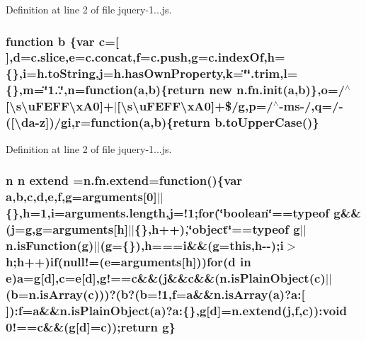Definition at line 2 of file jquery-\/1...\+js.

\hypertarget{jquery-1_811_80_8js_ac0431efac4d7c393d1e70b86115cb93f}{
\subsubsection[{b}]{\setlength{\rightskip}{0pt plus 5cm}function b \{var {\bf c}=\mbox{[}$\,$\mbox{]},{\bf d}=c.\+slice,{\bf e}=c.\+concat,f=c.\+push,g=c.\+index\+Of,h=\{\},i=h.\+to\+String,j=h.\+has\+Own\+Property,k=\char`\"{}\char`\"{}.trim,l=\{\},m=\char`\"{}1..\char`\"{},n=function({\bf a},b)\{return new n.\+fn.\+init({\bf a},b)\},o=/$^\wedge$\mbox{[}\textbackslash{}s\textbackslash{}u\+F\+E\+F\+F\textbackslash{}x\+A0\mbox{]}+$\vert$\mbox{[}\textbackslash{}s\textbackslash{}u\+F\+E\+F\+F\textbackslash{}x\+A0\mbox{]}+\$/g,p=/$^\wedge$-\/ms-\//,q=/-\/(\mbox{[}\textbackslash{}da-\/z\mbox{]})/gi,r=function({\bf a},b)\{return b.\+to\+Upper\+Case()\}}}\label{jquery-1_811_80_8js_ac0431efac4d7c393d1e70b86115cb93f}


Definition at line 2 of file jquery-\/1...\+js.

\hypertarget{jquery-1_811_80_8js_a95a6433c7ca35778b94dc2489f6838c9}{
\subsubsection[{extend}]{\setlength{\rightskip}{0pt plus 5cm}n n extend =n.\+fn.\+extend=function()\{var {\bf a},{\bf b},{\bf c},{\bf d},{\bf e},f,g=arguments\mbox{[}0\mbox{]}$\vert$$\vert$\{\},h=1,i=arguments.\+length,j=!1;for(\char`\"{}boolean\char`\"{}==typeof g\&\&(j=g,g=arguments\mbox{[}h\mbox{]}$\vert$$\vert$\{\},h++),\char`\"{}object\char`\"{}==typeof g$\vert$$\vert$n.\+is\+Function(g)$\vert$$\vert$(g=\{\}),h===i\&\&(g=this,h-\/-\/);i$>$h;h++){\bf if}(null!=({\bf e}=arguments\mbox{[}h\mbox{]}))for({\bf d} in {\bf e}){\bf a}=g\mbox{[}{\bf d}\mbox{]},{\bf c}={\bf e}\mbox{[}{\bf d}\mbox{]},g!=={\bf c}\&\&(j\&\&{\bf c}\&\&(n.\+is\+Plain\+Object({\bf c})$\vert$$\vert$({\bf b}=n.\+is\+Array({\bf c})))?({\bf b}?({\bf b}=!1,f={\bf a}\&\&n.\+is\+Array({\bf a})?a\+:\mbox{[}$\,$\mbox{]})\+:f={\bf a}\&\&n.\+is\+Plain\+Object({\bf a})?a\+:\{\},g\mbox{[}{\bf d}\mbox{]}=n.\+extend(j,f,{\bf c}))\+:void 0!=={\bf c}\&\&(g\mbox{[}{\bf d}\mbox{]}={\bf c}));return g\}}}\label{jquery-1_811_80_8js_a95a6433c7ca35778b94dc2489f6838c9}



